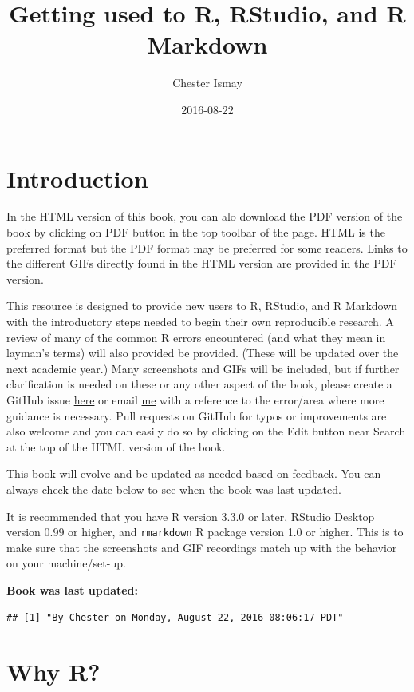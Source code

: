 \documentclass[]{tufte-book}
\title{Getting used to R, RStudio, and R Markdown}
\author{Chester Ismay}
\date{2016-08-22}
\begin{document}
\maketitle



{
\setcounter{tocdepth}{1}
\tableofcontents
}

\chapter{Introduction}\label{intro}

In the HTML version of this book, you can alo download the PDF version
of the book by clicking on PDF button in the top toolbar of the page.
HTML is the preferred format but the PDF format may be preferred for
some readers. Links to the different GIFs directly found in the HTML
version are provided in the PDF version.

This resource is designed to provide new users to R, RStudio, and R
Markdown with the introductory steps needed to begin their own
reproducible research. A review of many of the common R errors
encountered (and what they mean in layman's terms) will also provided be
provided. (These will be updated over the next academic year.) Many
screenshots and GIFs will be included, but if further clarification is
needed on these or any other aspect of the book, please create a GitHub
issue \href{https://github.com/ismayc/rbasics/issues}{here} or email
\href{mailto:chester.ismay@gmail.com}{me} with a reference to the
error/area where more guidance is necessary. Pull requests on GitHub for
typos or improvements are also welcome and you can easily do so by
clicking on the Edit button near Search at the top of the HTML version
of the book.

This book will evolve and be updated as needed based on feedback. You
can always check the date below to see when the book was last updated.

It is recommended that you have R version 3.3.0 or later, RStudio
Desktop version 0.99 or higher, and \texttt{rmarkdown} R package version
1.0 or higher. This is to make sure that the screenshots and GIF
recordings match up with the behavior on your machine/set-up.

\textbf{Book was last updated:}

\begin{verbatim}
## [1] "By Chester on Monday, August 22, 2016 08:06:17 PDT"
\end{verbatim}

\chapter{Why R?}\label{whyR}
\end{document}
